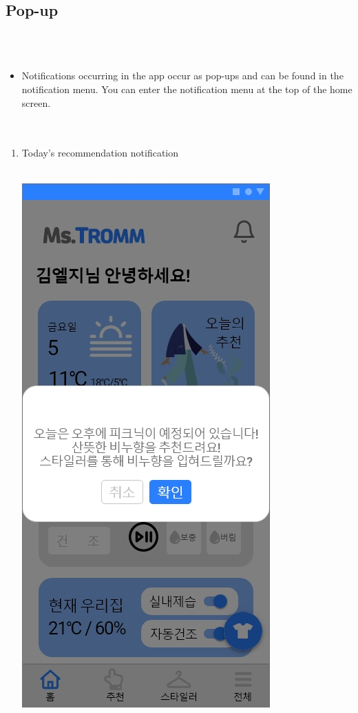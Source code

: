 \documentclass[conference]{IEEEtran}
\begin{document}
\subsection{Pop-up} \\ \\
\begin{itemize}
    \item[] Notifications occurring in the app occur as pop-ups and can be found in the notification menu. You can enter the notification menu at the top of the home screen.\\ \\ \\
\end{itemize}
\begin{enumerate}
    \item Today's recommendation notification \\ \\
    \centerline{\includegraphics[scale=0.18]{오늘의 추천 팝업1.jpg}
}
\end{enumerate}
\end{document}
